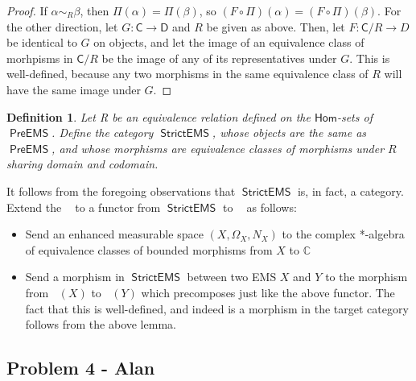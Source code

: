 \documentclass{article}
\newcommand{\C}{\mathbb{C}}
\newtheorem{definition}[subsection]{Definition}
\DeclareMathOperator{\calg}{\textsf{CAlg}^{*}_{\mathbb{C}}}
\DeclareMathOperator{\linf}{L^\infty}
\DeclareMathOperator{\preems}{\textsf{PreEMS}}
\DeclareMathOperator{\strictems}{\textsf{StrictEMS}}
\begin{document}
\begin{proof}
	If $\alpha\sim_R\beta$, then $\Pi(\alpha)=\Pi(\beta)$, so $(F\circ\Pi)(\alpha) = (F\circ\Pi)(\beta)$.  For the other direction, let $G:\textsf{C}\rightarrow{\textsf{D}}$ and $R$ be given as above.  Then, let $F: \textsf{C}/R\rightarrow{D}$ be identical to $G$ on objects, and let the image of an equivalence class of morhpisms in $\textsf{C}/R$ be the image of any of its representatives under $G$.  This is well-defined, because any two morphisms in the same equivalence class of $R$ will have the same image under $G$.
\end{proof}
\begin{definition}
	Let R be an equivalence relation defined on the $\textsf{Hom}$-sets of $\preems$.  Define the category $\strictems$, whose objects are the same as $\preems$, and whose morphisms are equivalence classes of morphisms under $R$ sharing domain and codomain.
\end{definition}
It follows from the foregoing observations that $\strictems$ is, in fact, a category.  Extend the $\linf$ to a functor from $\strictems$ to $\calg$ as follows:
\begin{itemize}
	\item Send an enhanced measurable space $(X,\Omega_X,N_X)$ to the complex *-algebra of equivalence classes of bounded morphisms from $X$ to $\C$
	\item Send a morphism in $\strictems$ between two EMS $X$ and $Y$ to the morphism from $\linf(X)$ to $\linf(Y)$ which precomposes just like the above functor.  The fact that this is well-defined, and indeed is a morphism in the target category follows from the above lemma.
\end{itemize}
\subsection{Problem 4 - Alan}
\end{document}
